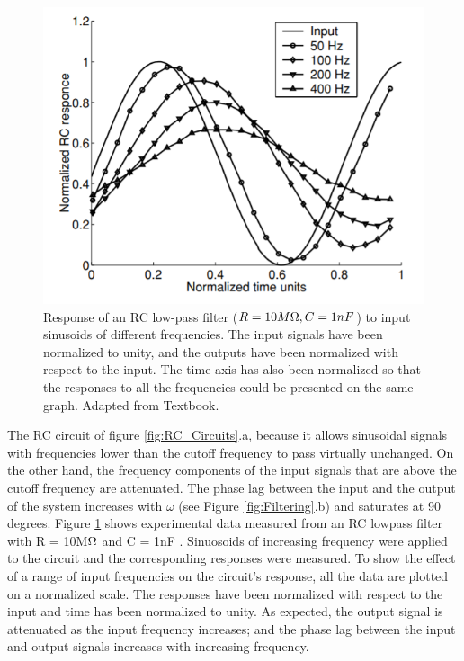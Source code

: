 \begin{figure}[H]
    \centering
    \includegraphics[width=0.55\linewidth]{../../Figures/Low_Pass_Filtering.PNG}
    \caption{Response of an RC low-pass filter ($R = 10M\ohm, C = 1nF$) to input sinusoids of different frequencies. The input signals have been normalized to unity, and the outputs have been normalized with respect to the input. The time axis has also been normalized so that the responses to all the frequencies could be presented on the same graph. Adapted from Textbook.}
    \label{fig:Filtering_2}
\end{figure}


The RC circuit of figure \ref{fig:RC_Circuits}.a, because it allows sinusoidal
signals with frequencies lower than the cutoff frequency to pass virtually
unchanged. On the other hand, the frequency components of the input signals
that are above the cutoff frequency are attenuated. The phase lag between the
input and the output of the system increases with $\omega$ (see Figure \ref{fig:Filtering}.b) and saturates at 90 degrees. Figure \ref{fig:Filtering_2} shows experimental data measured from an RC lowpass filter with R = 10M$\ohm$ and C = 1nF . Sinuosoids of increasing
frequency were applied to the circuit and the corresponding responses were
measured. To show the effect of a range of input frequencies on the circuit’s
response, all the data are plotted on a normalized scale. The responses have
been normalized with respect to the input and time has been normalized to
unity. As expected, the output signal is attenuated as the input frequency
increases; and the phase lag between the input and output signals increases
with increasing frequency.

